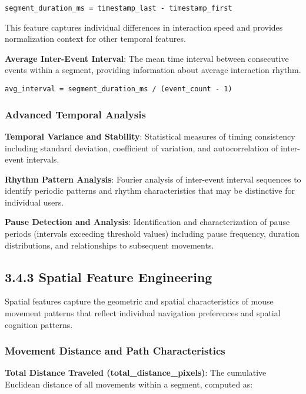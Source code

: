 \documentclass[
  12pt,
  a4paper,
]{report}
\begin{document}
\begin{verbatim}
segment_duration_ms = timestamp_last - timestamp_first
\end{verbatim}

This feature captures individual differences in interaction speed and
provides normalization context for other temporal features.

\textbf{Average Inter-Event Interval}: The mean time interval between
consecutive events within a segment, providing information about average
interaction rhythm.

\begin{verbatim}
avg_interval = segment_duration_ms / (event_count - 1)
\end{verbatim}

\subsubsection{Advanced Temporal
Analysis}\label{advanced-temporal-analysis}

\textbf{Temporal Variance and Stability}: Statistical measures of timing
consistency including standard deviation, coefficient of variation, and
autocorrelation of inter-event intervals.

\textbf{Rhythm Pattern Analysis}: Fourier analysis of inter-event
interval sequences to identify periodic patterns and rhythm
characteristics that may be distinctive for individual users.

\textbf{Pause Detection and Analysis}: Identification and
characterization of pause periods (intervals exceeding threshold values)
including pause frequency, duration distributions, and relationships to
subsequent movements.

\subsection{3.4.3 Spatial Feature
Engineering}\label{spatial-feature-engineering}

Spatial features capture the geometric and spatial characteristics of
mouse movement patterns that reflect individual navigation preferences
and spatial cognition patterns.

\subsubsection{Movement Distance and Path
Characteristics}\label{movement-distance-and-path-characteristics}

\textbf{Total Distance Traveled (total\_distance\_pixels)}: The
cumulative Euclidean distance of all movements within a segment,
computed as:
\end{document}
